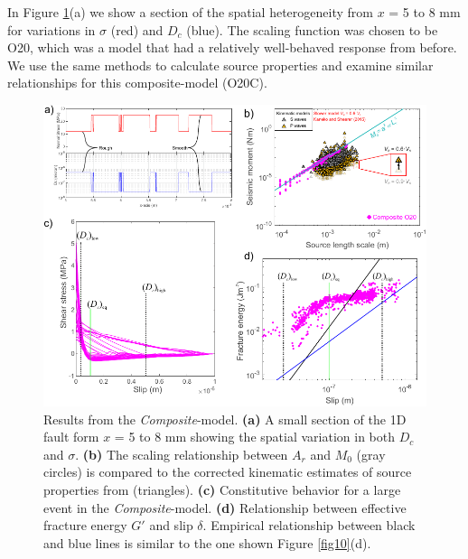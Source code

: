 \documentclass[final,3p, 11pt,authoryear]{elsarticle}
\begin{document}
In Figure \ref{fig12}(a) we show a section of the spatial heterogeneity from $x$ =  5 to 8 mm for variations in $\sigma$ (red) and $D_{c}$ (blue).  The scaling function was chosen to be O20, which was a model that had a relatively well-behaved response from before.  We use the same methods to calculate source properties and examine similar relationships for this composite-model (O20C).

\begin{figure}
	\centering
	\includegraphics{FIG12.pdf} 
	\caption{Results from the \textit{Composite}-model. \textbf{(a)} A small section of the 1D fault form $x$ = 5 to 8 mm showing the spatial variation in both $D_{c}$ and $\sigma$. \textbf{(b)} The scaling relationship between $A_{r}$ and $M_{0}$ (gray circles) is compared to the corrected kinematic estimates of source properties from \citet{Selvadurai2019} (triangles).   \textbf{(c)} Constitutive behavior for a large event in the \textit{Composite}-model. \textbf{(d)} Relationship between effective fracture energy $G'$ and slip $\delta$. Empirical relationship between black and blue lines is similar to the one shown Figure \ref{fig10}(d).}
	\label{fig12}
\end{figure}
\end{document}
